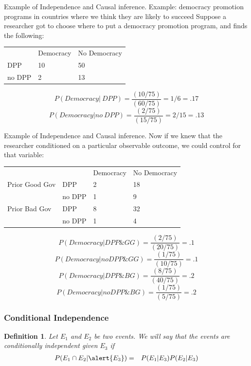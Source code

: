 \documentclass[aspectratio=169]{beamer}
\newtheorem{defn}{Definition}
\numberwithin{equation}{section}
\begin{document}
\begin{frame}{Example of Independence and Causal inference.}
Example: democracy promotion programs in countries where we think they are likely to succeed\pause
Suppose a researcher got to choose where to put a democracy promotion program, and finds the following:
\begin{table}
\begin{tabular}{lll}
		&Democracy& No Democracy\\
DPP &10 & 50\\
no DPP & 2& 13\\

\end{tabular}
\end{table}
\pause
$$P(Democracy|\ DPP)= \frac{(10/75)}{(60/75)} =1/6= .17$$
$$P(Democracy| no\ DPP)=  \frac{(2 /75)}{(15/75)} = 2/15=.13$$

 \end{frame}




\begin{frame}{Example of Independence and Causal inference.}
Now if we knew that the researcher conditioned on a particular observable outcome, we could control for that variable:\pause

\begin{table}
\begin{tabular}{llll}
		&&Democracy& No Democracy\\
 Prior Good Gov & DPP &2 & 18\\
		 &no DPP & 1& 9\\
		 \hline
Prior Bad Gov  & DPP &8 & 32\\
		&no DPP & 1& 4\\



\end{tabular}
\end{table}
\pause
\begin{small}
$$P(Democracy| DPP\& GG)= \frac{(2/75)}{( 20/75)} = .1$$
$$P(Democracy| no DPP\& GG)=  \frac{(1/75)}{(10/75)} = .1$$
\pause
$$P(Democracy| DPP\& BG)= \frac{(8/75)}{( 40/75)} = .2$$
$$P(Democracy| no DPP\& BG)=  \frac{(1/75)}{(5/75)} = .2$$
\end{small}
 \end{frame}




\begin{frame}
\frametitle{Conditional  Independence}

\begin{defn}
Let $E_{1}$ and $E_{2}$ be two events.  We will say that the events are conditionally independent given $E_{3}$ if 
\begin{eqnarray}
P(E_{1} \cap E_{2} | \alert{E_{3}}) & = & P(E_{1} | E_{3} ) P(E_{2} | E_{3} ) \nonumber 
\end{eqnarray}


\end{defn}



\end{frame}
\end{document}
